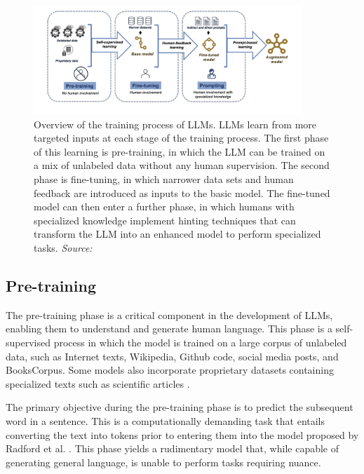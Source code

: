 \begin{figure}[h!]
    \centering
    \includegraphics[width=0.9\textwidth]{images/llms/LLM-training-process.png}
    \caption{Overview of the training process of LLMs. LLMs learn from more targeted inputs at each stage of the training process. The first phase of this learning is pre-training, in which the LLM can be trained on a mix of unlabeled data without any human supervision. The second phase is fine-tuning, in which narrower data sets and human feedback are introduced as inputs to the basic model. The fine-tuned model can then enter a further phase, in which humans with specialized knowledge implement hinting techniques that can transform the LLM into an enhanced model to perform specialized tasks. \textit{Source:} \cite{omiye2023large}}
    \label{fig:training-process}
\end{figure}

\subsection{Pre-training}

The pre-training phase is a critical component in the development of LLMs, enabling them to understand and generate human language. This phase is a self-supervised process in which the model is trained on a large corpus of unlabeled data, such as Internet texts, Wikipedia, Github code, social media posts, and BooksCorpus. Some models also incorporate proprietary datasets containing specialized texts such as scientific articles \cite{brown2020language, devlin2018bert}.

The primary objective during the pre-training phase is to predict the subsequent word in a sentence. This is a computationally demanding task that entails converting the text into tokens prior to entering them into the model proposed by Radford et al. \cite{radford2019language}. This phase yields a rudimentary model that, while capable of generating general language, is unable to perform tasks requiring nuance.

